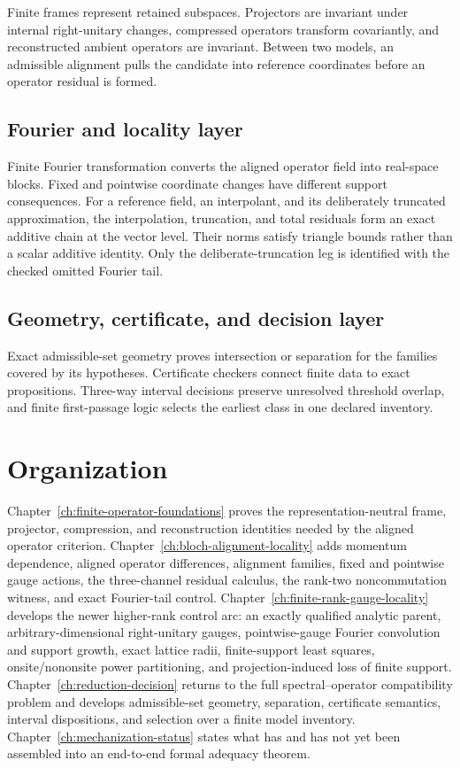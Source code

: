 Finite frames represent retained subspaces.  Projectors are invariant under internal
right-unitary changes, compressed operators transform covariantly, and reconstructed
ambient operators are invariant.  Between two models, an admissible alignment pulls the
candidate into reference coordinates before an operator residual is formed.

\subsection{Fourier and locality layer}

Finite Fourier transformation converts the aligned operator field into real-space
blocks.  Fixed and pointwise coordinate changes have different support consequences.
For a reference field, an interpolant, and its deliberately truncated approximation,
the interpolation, truncation, and total residuals form an exact additive chain at the
vector level.  Their norms satisfy triangle bounds rather than a scalar additive
identity.  Only the deliberate-truncation leg is identified with the checked omitted
Fourier tail.

\subsection{Geometry, certificate, and decision layer}

Exact admissible-set geometry proves intersection or separation for the families covered
by its hypotheses.  Certificate checkers connect finite data to exact propositions.
Three-way interval decisions preserve unresolved threshold overlap, and finite
first-passage logic selects the earliest class in one declared inventory.

\section{Organization}

Chapter~\ref{ch:finite-operator-foundations} proves the representation-neutral frame,
projector, compression, and reconstruction identities needed by the aligned operator
criterion.  Chapter~\ref{ch:bloch-alignment-locality} adds momentum dependence, aligned
operator differences, alignment families, fixed and pointwise gauge actions, the
three-channel residual calculus, the rank-two noncommutation witness, and exact
Fourier-tail control.  Chapter~\ref{ch:finite-rank-gauge-locality} develops the newer
higher-rank control arc: an exactly qualified analytic parent, arbitrary-dimensional
right-unitary gauges, pointwise-gauge Fourier convolution and support growth, exact
lattice radii, finite-support least squares, onsite/nononsite power partitioning, and
projection-induced loss of finite support.
Chapter~\ref{ch:reduction-decision} returns to the full spectral--operator compatibility
problem and develops admissible-set geometry, separation, certificate semantics,
interval dispositions, and selection over a finite model inventory.
Chapter~\ref{ch:mechanization-status} states what has and has not yet been assembled into
an end-to-end formal adequacy theorem.

